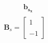 \documentclass[preview]{standalone}
\begin{document}
\begin{align*}
\begin{array}{c}\begin{matrix}\hspace{1cm} \mathbf{b_{s_x}}\end{matrix} \\  \mathbf{B}_s = \begin{bmatrix} 1 \\ \\-1 \end{bmatrix} \end{array}
\end{align*}
\end{document}
